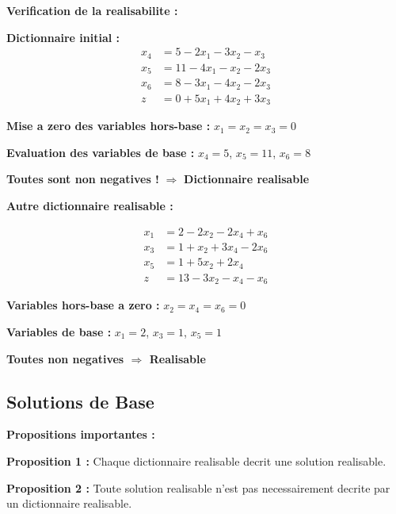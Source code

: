 \documentclass[12pt,a4paper]{article}
\begin{document}
\begin{exemple}
\textbf{Verification de la realisabilite :}

\textbf{Dictionnaire initial :}
\begin{align*}
x_4 &= 5 - 2x_1 - 3x_2 - x_3\\
x_5 &= 11 - 4x_1 - x_2 - 2x_3\\
x_6 &= 8 - 3x_1 - 4x_2 - 2x_3\\
z &= 0 + 5x_1 + 4x_2 + 3x_3
\end{align*}

\textbf{Mise a zero des variables hors-base :} $x_1 = x_2 = x_3 = 0$

\textbf{Evaluation des variables de base :} $x_4 = 5$, $x_5 = 11$, $x_6 = 8$

\textbf{Toutes sont non negatives !} $\Rightarrow$ \textcolor{defvert}{\textbf{Dictionnaire realisable}}
\end{exemple}

\begin{exemple}
\textbf{Autre dictionnaire realisable :}

\begin{align*}
x_1 &= 2 - 2x_2 - 2x_4 + x_6\\
x_3 &= 1 + x_2 + 3x_4 - 2x_6\\
x_5 &= 1 + 5x_2 + 2x_4\\
z &= 13 - 3x_2 - x_4 - x_6
\end{align*}

\textbf{Variables hors-base a zero :} $x_2 = x_4 = x_6 = 0$

\textbf{Variables de base :} $x_1 = 2$, $x_3 = 1$, $x_5 = 1$

\textcolor{defvert}{\textbf{Toutes non negatives $\Rightarrow$ Realisable}}
\end{exemple}

\newpage
\subsection{Solutions de Base}

\begin{definition}
\textbf{Propositions importantes :}

\textbf{Proposition 1 :} Chaque dictionnaire realisable decrit une solution realisable.

\textbf{Proposition 2 :} Toute solution realisable n'est pas necessairement decrite par un dictionnaire realisable.
\end{definition}
\end{document}
